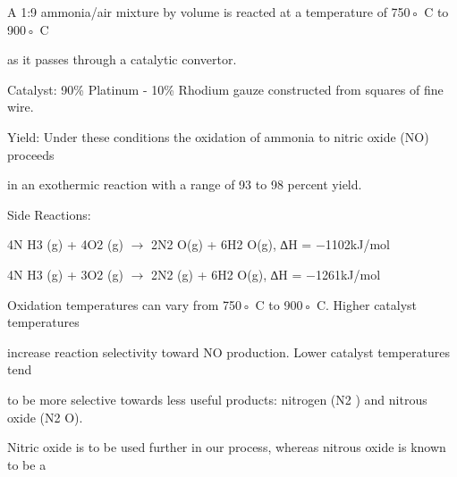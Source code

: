 \documentclass[a4paper,portrait,12pt]{article}
\begin{document}
\begin{flushleft}
A 1:9 ammonia/air mixture by volume is reacted at a temperature of 750◦ C to 900◦ C
\end{flushleft}


\begin{flushleft}
as it passes through a catalytic convertor.
\end{flushleft}


\begin{flushleft}
Catalyst: 90\% Platinum - 10\% Rhodium gauze constructed from squares of fine wire.
\end{flushleft}


\begin{flushleft}
Yield: Under these conditions the oxidation of ammonia to nitric oxide (NO) proceeds
\end{flushleft}


\begin{flushleft}
in an exothermic reaction with a range of 93 to 98 percent yield.
\end{flushleft}


\begin{flushleft}
Side Reactions:
\end{flushleft}


\begin{flushleft}
4N H3 (g) + 4O2 (g) $\rightarrow$ 2N2 O(g) + 6H2 O(g), ∆H = $-$1102kJ/mol
\end{flushleft}


\begin{flushleft}
4N H3 (g) + 3O2 (g) $\rightarrow$ 2N2 (g) + 6H2 O(g), ∆H = $-$1261kJ/mol
\end{flushleft}





\begin{flushleft}
Oxidation temperatures can vary from 750◦ C to 900◦ C. Higher catalyst temperatures
\end{flushleft}


\begin{flushleft}
increase reaction selectivity toward NO production. Lower catalyst temperatures tend
\end{flushleft}


\begin{flushleft}
to be more selective towards less useful products: nitrogen (N2 ) and nitrous oxide (N2 O).
\end{flushleft}


\begin{flushleft}
Nitric oxide is to be used further in our process, whereas nitrous oxide is known to be a
\end{flushleft}
\end{document}
